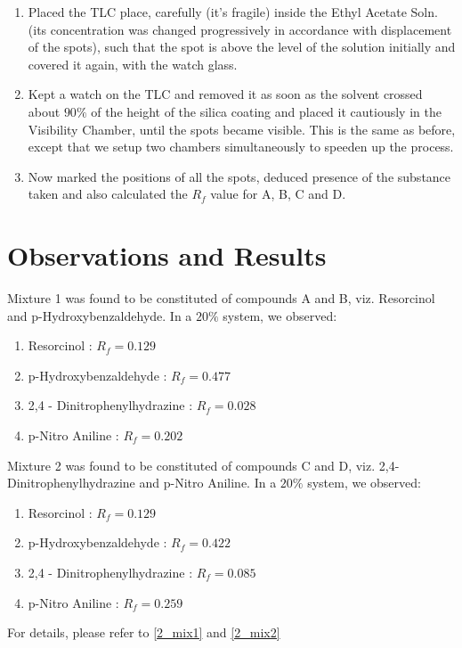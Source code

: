 \begin{enumerate}
		\item Placed the TLC place, carefully (it's fragile) inside the Ethyl Acetate Soln. (its concentration was changed progressively in accordance with displacement of the spots), such that the spot is above the level of the solution initially and covered it again, with the watch glass. 
		\item Kept a watch on the TLC and removed it as soon as the solvent crossed about $90\%$ of the height of the silica coating and placed it cautiously in the Visibility Chamber, until the spots became visible. This is the same as before, except that we setup two chambers simultaneously to speeden up the process.
		\item Now marked the positions of all the spots, deduced presence of the substance taken and also calculated the $R_f$ value for A, B, C and D.
	\end{enumerate}
\section{Observations and Results}
	Mixture 1 was found to be constituted of compounds A and B, viz. Resorcinol and p-Hydroxybenzaldehyde. In a $20\%$ system, we observed:
	\begin{enumerate}
		\item Resorcinol : $R_f=0.129$
		\item p-Hydroxybenzaldehyde : $R_f=0.477$
		\item 2,4 - Dinitrophenylhydrazine : $R_f=0.028$
		\item p-Nitro Aniline : $R_f=0.202$
	\end{enumerate}

	Mixture 2 was found to be constituted of compounds C and D, viz. 2,4-Dinitrophenylhydrazine and p-Nitro Aniline. In a $20\%$ system, we observed:
	\begin{enumerate}
		\item Resorcinol : $R_f=0.129$
		\item p-Hydroxybenzaldehyde : $R_f=0.422$
		\item 2,4 - Dinitrophenylhydrazine : $R_f=0.085$
		\item p-Nitro Aniline : $R_f=0.259$
	\end{enumerate}
	
	For details, please refer to \autoref{2_mix1} and \autoref{2_mix2}

